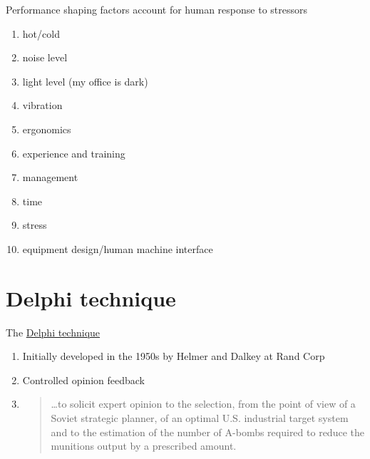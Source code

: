 \documentclass[aspectratio=1610,pdftex,dvipsnames,compress,xcolor={dvipsnames}]{beamer}
\begin{document}
\begin{frame}{Performance shaping factors account for human response to stressors}
    \begin{enumerate}[series=outerlist,topsep=0pt,itemsep=3pt,leftmargin=*,label=(\arabic*)]
        \item[]hot/cold  
        \item[]noise level   
        \item[]light level (my office is dark)  
        \item[]vibration  
        \item[]ergonomics
        \item[]experience and training
        \item[]management
        \item[]time
        \item[]stress
        \item[]equipment design/human machine interface
    \end{enumerate}
\end{frame}


\section{Delphi technique}


\addtocounter{framenumber}{-1}
\begin{frame}{The \href{https://uidaho.pressbooks.pub/riskassessment/chapter/failure-rates/}{Delphi technique}}
    \begin{enumerate}[series=outerlist,topsep=0pt,itemsep=21pt,leftmargin=*,label=(\arabic*)]
        \item[]Initially developed in the 1950s by Helmer and Dalkey at Rand Corp
        \item[]Controlled opinion feedback
        \item[]
            \begin{quote}
                \ldots to solicit expert opinion to the selection, from the point of view of a Soviet strategic planner, of an optimal U.S. industrial target system and to the estimation of the number of A-bombs required to reduce the munitions output by a prescribed amount.
            \end{quote}
    \end{enumerate}
\end{frame}
\end{document}
